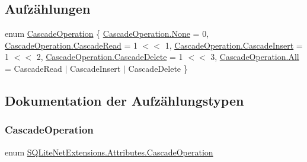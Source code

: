 \subsection*{Aufzählungen}
\begin{DoxyCompactItemize}
\item 
enum \mbox{\hyperlink{namespace_s_q_lite_net_extensions_1_1_attributes_a84ac4ba359abf94192d7335a2303c619}{Cascade\+Operation}} \{ \newline
\mbox{\hyperlink{namespace_s_q_lite_net_extensions_1_1_attributes_a84ac4ba359abf94192d7335a2303c619a6adf97f83acf6453d4a6a4b1070f3754}{Cascade\+Operation.\+None}} = 0, 
\mbox{\hyperlink{namespace_s_q_lite_net_extensions_1_1_attributes_a84ac4ba359abf94192d7335a2303c619a09d8036e66635d32d5bc86353b26f82d}{Cascade\+Operation.\+Cascade\+Read}} = 1 $<$$<$ 1, 
\mbox{\hyperlink{namespace_s_q_lite_net_extensions_1_1_attributes_a84ac4ba359abf94192d7335a2303c619a9a8e1e11b4ee4dcbba0e3ba72f4ac38f}{Cascade\+Operation.\+Cascade\+Insert}} = 1 $<$$<$ 2, 
\mbox{\hyperlink{namespace_s_q_lite_net_extensions_1_1_attributes_a84ac4ba359abf94192d7335a2303c619a622b21a578f9078f16ac0aeba9ffe843}{Cascade\+Operation.\+Cascade\+Delete}} = 1 $<$$<$ 3, 
\newline
\mbox{\hyperlink{namespace_s_q_lite_net_extensions_1_1_attributes_a84ac4ba359abf94192d7335a2303c619ab1c94ca2fbc3e78fc30069c8d0f01680}{Cascade\+Operation.\+All}} = Cascade\+Read $\vert$ Cascade\+Insert $\vert$ Cascade\+Delete
 \}
\end{DoxyCompactItemize}


\subsection{Dokumentation der Aufzählungstypen}
\mbox{\label{namespace_s_q_lite_net_extensions_1_1_attributes_a84ac4ba359abf94192d7335a2303c619}} 
\subsubsection{\texorpdfstring{Cascade\+Operation}{CascadeOperation}}
{\footnotesize\ttfamily enum \mbox{\hyperlink{namespace_s_q_lite_net_extensions_1_1_attributes_a84ac4ba359abf94192d7335a2303c619}{S\+Q\+Lite\+Net\+Extensions.\+Attributes.\+Cascade\+Operation}}\hspace{0.3cm}{\ttfamily [strong]}}

